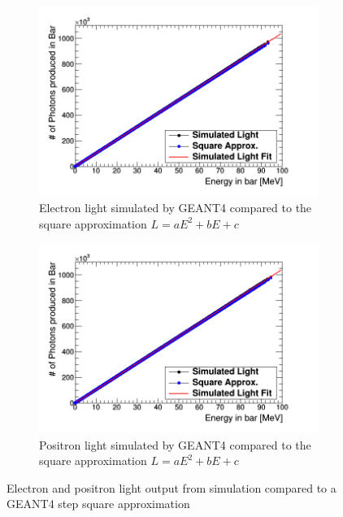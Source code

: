 \begin{figure}[!h]
\centering
\begin{subfigure}{.5\textwidth}
  \centering
  \includegraphics[width=\linewidth]{light_of_electronsLin0-100mev.png}
  \captionsetup{width=.9\linewidth}
  \caption{Electron light simulated by GEANT4 compared to the square approximation $L = aE^2 + bE+ c$ }
  \label{subFig:square_electron_light}
\end{subfigure}%
\begin{subfigure}{.5\textwidth}
  \centering
  \includegraphics[width=\linewidth]{light_of_positronsLin0-100mev.png}
  \captionsetup{width=.9\linewidth}
  \caption{Positron light simulated by GEANT4 compared to the square approximation $L = aE^2 + bE+ c$}
  \label{subFig:square_positron_light}
\end{subfigure}
\caption{Electron and positron light output from simulation compared to a GEANT4 step square approximation}
\label{fig:square_electron_positron_light}
\end{figure}
